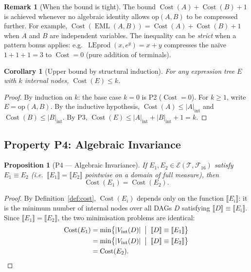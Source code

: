 \documentclass[12pt,a4paper]{article}
\newtheorem{corollary}[theorem]{Corollary}
\newtheorem{proposition}[theorem]{Proposition}
\theoremstyle{definition}
\newtheorem{remark}[theorem]{Remark}
\newcommand{\EML}{\operatorname{EML}}
\newcommand{\LEprod}{\operatorname{LEprod}}
\newcommand{\Cost}{\operatorname{Cost}}
\newcommand{\Fam}{\mathcal{F}}
\begin{document}
\begin{remark}[When the bound is tight]
The bound $\Cost(A) + \Cost(B) + 1$ is achieved whenever no algebraic
identity allows $\mathrm{op}(A,B)$ to be compressed further.  For example,
$\Cost(\EML(A, B)) = \Cost(A) + \Cost(B) + 1$ when $A$ and $B$ are
independent variables.  The inequality can be \emph{strict} when a pattern
bonus applies: e.g.\ $\LEprod(x, e^y) = x + y$ compresses the na\"{i}ve
$1 + 1 + 1 = 3$ to $\Cost = 0$ (pure addition of terminals).
\end{remark}

\begin{corollary}[Upper bound by structural induction]
\label{cor:UB-inductive}
For any expression tree $E$ with $k$ internal nodes, $\Cost(E) \leq k$.
\end{corollary}

\begin{proof}
By induction on $k$: the base case $k = 0$ is P2 ($\Cost = 0$).  For $k \geq 1$,
write $E = \mathrm{op}(A,B)$.  By the inductive hypothesis,
$\Cost(A) \leq |A|_{\mathrm{int}}$ and $\Cost(B) \leq |B|_{\mathrm{int}}$.
By P3, $\Cost(E) \leq |A|_{\mathrm{int}} + |B|_{\mathrm{int}} + 1 = k$.
\end{proof}

\subsection{Property P4: Algebraic Invariance}

\begin{proposition}[P4 --- Algebraic Invariance]
\label{prop:P4}
If $E_1, E_2 \in \mathcal{E}(\mathcal{T},\Fam_{16})$ satisfy
$E_1 \equiv E_2$ (i.e.\ $\llbracket E_1 \rrbracket = \llbracket E_2 \rrbracket$
pointwise on a domain of full measure), then
\[
  \Cost(E_1) = \Cost(E_2).
\]
\end{proposition}

\begin{proof}
By Definition~\ref{def:cost}, $\Cost(E_i)$ depends only on the function
$\llbracket E_i \rrbracket$: it is the minimum number of internal nodes over
all DAGs $D$ satisfying $\llbracket D \rrbracket \equiv \llbracket E_i
\rrbracket$.  Since $\llbracket E_1 \rrbracket = \llbracket E_2 \rrbracket$,
the two minimisation problems are identical:
\begin{align*}
  \Cost(E_1)
  &= \min\bigl\{|V_{\mathrm{int}}(D)| \;\bigm|\;
      \llbracket D \rrbracket \equiv \llbracket E_1 \rrbracket\bigr\} \\
  &= \min\bigl\{|V_{\mathrm{int}}(D)| \;\bigm|\;
      \llbracket D \rrbracket \equiv \llbracket E_2 \rrbracket\bigr\} \\
  &= \Cost(E_2). \qedhere
\end{align*}
\end{proof}
\end{document}
